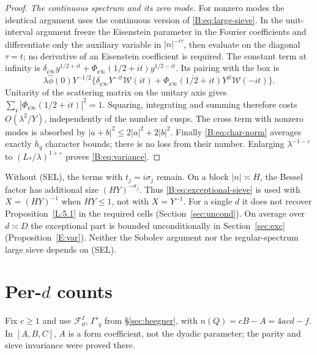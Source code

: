 \documentclass[10pt,reqno]{amsart}
\theoremstyle{definition}
\numberwithin{equation}{section}
\newcommand{\cF}{\mathcal F}
\begin{document}
\begin{proof}
\emph{The continuous spectrum and its zero mode.}
For nonzero modes the identical argument uses the continuous version of
\eqref{B:eq:large-sieve}. In the unit-interval argument freeze the
Eisenstein parameter in the Fourier coefficients and differentiate only
the auxiliary variable in \(|n|^{-i\tau}\), then evaluate on the diagonal
\(\tau=t\); no derivative of an Eisenstein coefficient is required.
The constant term at infinity is
\(\delta_{\mathfrak c\infty}y^{1/2+it}
 +\Phi_{\mathfrak c\infty}(1/2+it)y^{1/2-it}\).
Its pairing with the box is
\[
 \lambda\widehat\phi(0)Y^{-1/2}
 \{\delta_{\mathfrak c\infty}Y^{-it}\mathcal W(it)
  +\overline{\Phi_{\mathfrak c\infty}(1/2+it)}Y^{it}\mathcal W(-it)\}.
\]
Unitarity of the scattering matrix on the unitary axis gives
\(\sum_{\mathfrak c}|\Phi_{\mathfrak c\infty}(1/2+it)|^2=1\).
Squaring, integrating and summing therefore costs \(O(\lambda^2/Y)\),
independently of the number of cusps. The cross term with nonzero modes
is absorbed by \(|a+b|^2\le2|a|^2+2|b|^2\).
Finally \eqref{B:eq:char-norm} averages exactly \(h_q\) character bounds;
there is no loss from their number. Enlarging
\(\lambda^{-1-\varepsilon}\) to \((L_*/\lambda)^{1+\varepsilon}\) proves
\eqref{B:eq:variance}.
\end{proof}

Without (SEL), the terms with \(t_j=i\sigma_j\) remain. On a block
\(|n|\asymp H\), the Bessel factor has additional size
\((HY)^{-\sigma_j}\). Thus \eqref{B:eq:exceptional-sieve} is used with
\(X=(HY)^{-1}\) when \(HY\le1\), not with \(X=Y^{-1}\).
For a single $d$ it does not recover Proposition~\ref{L:5.1} in the
required cells (Section~\ref{sec:uncond}). On average over $d\asymp D$ the
exceptional part is bounded unconditionally in Section~\ref{sec:exc}
(Proposition~\ref{E:var}). Neither the Sobolev argument nor the
regular-spectrum large sieve depends on (SEL).

\section{Per-\texorpdfstring{$d$}{d} counts}\label{sec:perd}
Fix $c\ge1$ and use $\cF_d^I$, $\Gamma'_q$ from \S\ref{sec:heegner},
with $n(Q)=cB-A=4acd-f$. In $[A,B,C]$, $A$ is a form coefficient,
not the dyadic parameter; the parity and sieve invariance were proved there.
\end{document}
